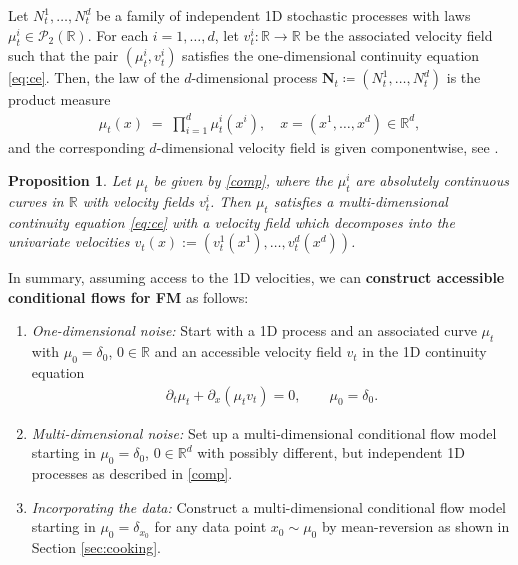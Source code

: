 \documentclass{article}
\newcommand{\R}{\mathbb{R}}
\theoremstyle{plain}
\newtheorem{proposition}[theorem]{Proposition}
\theoremstyle{definition}
\theoremstyle{remark}
\begin{document}
Let $N_t^1,\dots,N_t^d$ be a family of independent 1D stochastic processes with laws $\mu_t^i \in \mathcal{P}_2(\mathbb{R})$. For each $i=1,\dots,d$, let $v_t^i \colon \mathbb{R}\to\mathbb{R}$ be the associated velocity field such that the pair $(\mu_t^i, v_t^i)$ satisfies the one-dimensional continuity equation \eqref{eq:ce}. 
Then, the law of the $d$-dimensional process $\mathbf{N}_t \coloneqq (N_t^1,\dots,N_t^d)$ is the product measure  
\begin{align}\label{comp}
  \mu_t(x) \;=\; \prod_{i=1}^d \mu_t^i(x^i),
  \quad x=(x^1,\dots,x^d)\in\mathbb{R}^d,
\end{align}
and the corresponding $d$-dimensional velocity field is given componentwise, see
\cite{DCFS2025}.

\begin{proposition} \label{cont_eq_decomposes}
Let $\mu_t$ be given by \eqref{comp},
where the  $\mu^i_t$  are absolutely continuous curves in $\R$ with velocity fields $v^i_t$.
Then $\mu_t$ satisfies 
a {multi-dimensional} continuity equation  \eqref{eq:ce} with a velocity field which decomposes into the univariate velocities 
$v_t(x) := \left( v^1_t(x^1), \dots, v^d_t(x^d) \right)$.
\end{proposition}

In summary, assuming access to the 1D velocities,
we can \textbf{construct accessible conditional flows for 
FM} as follows:
\begin{enumerate}
\item
\emph{One-dimensional noise:}
Start with {a 1D process and} an {associated} 
{curve} 
$\mu_t$ {with} $\mu_0=\delta_0$, $0 \in \R$ and an accessible velocity field $v_t$ in the 1D continuity equation
\begin{align}\label{eq:ce_1d}
\partial_t \mu_t + 
\partial_x  (\mu_t v_t)=0, \qquad \mu_0 = \delta_0.
\end{align}
\item
\emph{Multi-dimensional noise:}
Set up a multi-dimensional conditional flow model starting in $\mu_0 = \delta_0$, $0 \in \R^d$ with  possibly different, but independent 1D processes
as described in \eqref{comp}.
\item \emph{Incorporating the data:}
Construct a multi-dimensional conditional flow model starting in $\mu_0 = \delta_{x_0}$ for any data point $x_0 \sim \mu_0$ by mean-reversion as shown in
Section \ref{sec:cooking}.
\end{enumerate}
\end{document}
